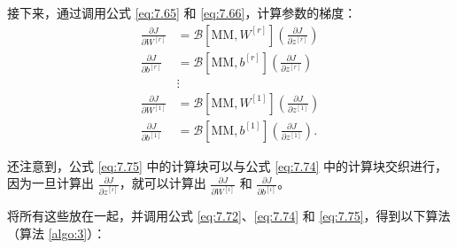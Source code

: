 接下来，通过调用公式 \eqref{eq:7.65} 和 \eqref{eq:7.66}，计算参数的梯度：
\begin{equation}
    \begin{aligned}
        \frac{\partial J}{\partial W^{[r]}} &= \mathcal{B}[\text{MM}, W^{[r]}]\left(\frac{\partial J}{\partial z^{[r]}}\right) \\
        \frac{\partial J}{\partial b^{[r]}} &= \mathcal{B}[\text{MM}, b^{[r]}]\left(\frac{\partial J}{\partial z^{[r]}}\right) \\
        &\vdots \\
        \frac{\partial J}{\partial W^{[1]}} &= \mathcal{B}[\text{MM}, W^{[1]}]\left(\frac{\partial J}{\partial z^{[1]}}\right) \\
        \frac{\partial J}{\partial b^{[1]}} &= \mathcal{B}[\text{MM}, b^{[1]}]\left(\frac{\partial J}{\partial z^{[1]}}\right).
    \end{aligned} \label{eq:7.75}
\end{equation}

还注意到，公式 \eqref{eq:7.75} 中的计算块可以与公式 \eqref{eq:7.74} 中的计算块交织进行，因为一旦计算出 $\frac{\partial J}{\partial z^{[i]}}$，就可以计算出 $\frac{\partial J}{\partial W^{[i]}}$ 和 $\frac{\partial J}{\partial b^{[i]}}$。

将所有这些放在一起，并调用公式 \eqref{eq:7.72}、\eqref{eq:7.74} 和 \eqref{eq:7.75}，得到以下算法（算法 \ref{algo:3}）：

